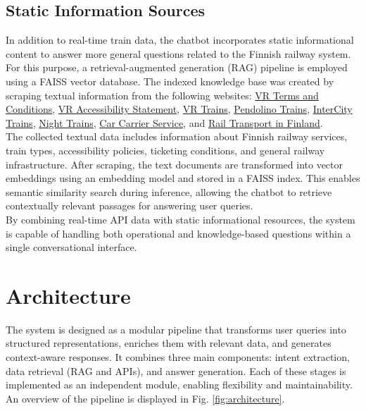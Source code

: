 \documentclass[fleqn,moreauthors,10pt]{ds_report}
\begin{document}
\subsection*{Static Information Sources} \label{websites}

In addition to real-time train data, the chatbot incorporates static informational content to answer more general questions related to the Finnish railway system. For this purpose, a retrieval-augmented generation (RAG) pipeline is employed using a FAISS vector database. The indexed knowledge base was created by scraping textual information from the following websites:
\href{https://www.vr.fi/en/terms-and-conditions}{VR Terms and Conditions},
\href{https://www.vr.fi/en/accessibility-statement}{VR Accessibility Statement},
\href{https://www.finlandtrains.com/vr-trains}{VR Trains},
\href{https://www.finlandtrains.com/pendolino-trains}{Pendolino Trains},
\href{https://://www.finlandtrains.com/intercity-trains}{InterCity Trains},
\href{https://www.finlandtrains.com/night-trains}{Night Trains},
\href{https://www.vr.fi/en/carcarrier}{Car Carrier Service},
and
\href{https://en.wikipedia.org/wiki/Rail_transport_in_Finland}{Rail Transport in Finland}.
\\
The collected textual data includes information about Finnish railway services, train types, accessibility policies, ticketing conditions, and general railway infrastructure. After scraping, the text documents are transformed into vector embeddings using an embedding model and stored in a FAISS index. This enables semantic similarity search during inference, allowing the chatbot to retrieve contextually relevant passages for answering user queries. \\
By combining real-time API data with static informational resources, the system is capable of handling both operational and knowledge-based questions within a single conversational interface.



\section*{Architecture}
The system is designed as a modular pipeline that transforms user queries into structured representations, enriches them with relevant data, and generates context-aware responses. It combines three main components: intent extraction, data retrieval (RAG and APIs), and answer generation. Each of these stages is implemented as an independent module, enabling flexibility and maintainability. An overview of the pipeline is displayed in Fig. \ref{fig:architecture}.
\end{document}
